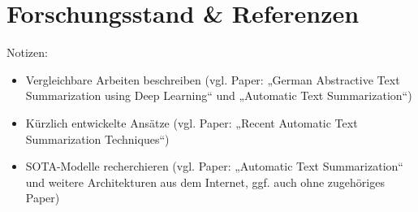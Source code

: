 \section{Forschungsstand \& Referenzen}
Notizen:
\begin{itemize}
	\item Vergleichbare Arbeiten beschreiben (vgl. Paper: „German Abstractive Text Summarization using Deep Learning“ und „Automatic Text Summarization“)
	\item Kürzlich entwickelte Ansätze (vgl. Paper: „Recent Automatic Text Summarization Techniques“)
	\item SOTA-Modelle recherchieren (vgl. Paper: „Automatic Text Summarization“ und weitere Architekturen aus dem Internet, ggf. auch ohne zugehöriges Paper)
\end{itemize}
